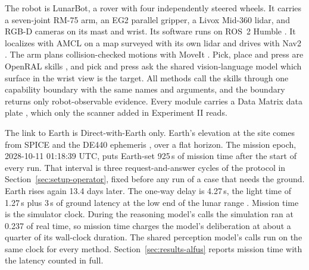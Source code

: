 The robot is LunarBot, a rover with four independently steered wheels. It carries a seven-joint RM-75 arm, an EG2
parallel gripper, a Livox Mid-360 lidar, and RGB-D cameras on its mast and wrist. Its software runs on ROS~2 Humble
\citep{macenski2022ros2}. It localizes with AMCL on a map surveyed with its own lidar and drives with Nav2
\citep{macenski2020nav2}. The arm plans collision-checked motions with MoveIt \citep{coleman2014moveit}. Pick, place and
press are OpenRAL skills \citep{openral}, and pick and press ask the shared vision-language model which surface in the
wrist view is the target. All methods call the skills through one capability boundary with the same names and
arguments, and the boundary returns only robot-observable evidence. Every module carries a Data Matrix data plate
\citep{nasa2020std6002}, which only the scanner added in Experiment II reads.

The link to Earth is Direct-with-Earth only. Earth's elevation at the site comes from SPICE and the DE440 ephemeris
\citep{acton1996spice,park2021de440}, over a flat horizon. The mission epoch, 2028-10-11 01:18:39 UTC, puts Earth-set
925\,s of mission time after the start of every run. That interval is three request-and-answer cycles of the protocol
in Section~\ref{sec:setup-operator}, fixed before any run of a case that needs the ground. Earth rises again 13.4 days
later. The one-way delay is 4.27\,s, the light time of 1.27\,s plus 3\,s of ground latency at the low end of the lunar
range \citep{landon2025delay}. Mission time is the simulator clock. During the reasoning model's calls the simulation ran at 0.237 of real time,
so mission time charges the model's deliberation at about a quarter of its wall-clock duration. The shared perception
model's calls run on the same clock for every method. Section~\ref{sec:results-alfus} reports mission time with the
latency counted in full.

